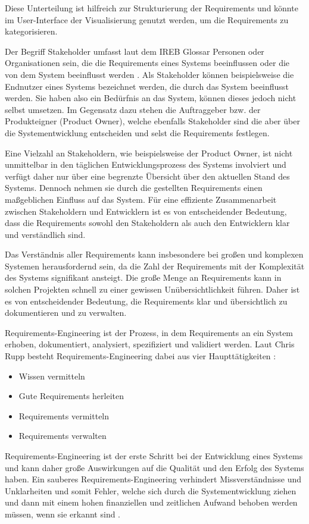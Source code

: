     Diese Unterteilung ist hilfreich zur Strukturierung der Requirements und könnte im User-Interface der Visualisierung genutzt werden, um die Requirements zu kategorisieren.
    

    Der Begriff Stakeholder umfasst laut dem IREB Glossar \glqq{}Personen oder Organisationen sein, die die Requirements eines Systems beeinflussen oder die von dem System beeinflusst werden\grqq{} \autocite[][]{ireb_cpre_glossary}.
    Als Stakeholder können beispielsweise die Endnutzer eines Systems bezeichnet werden, die durch das System beeinflusst werden.
    Sie haben also ein Bedürfnis an das System, können dieses jedoch nicht selbst umsetzen.
    Im Gegensatz dazu stehen die Auftraggeber bzw. der Produkteigner (Product Owner), welche ebenfalls Stakeholder sind die aber über die Systementwicklung entscheiden und selst die Requirements festlegen.

    Eine Vielzahl an Stakeholdern, wie beispielsweise der Product Owner, ist nicht unmittelbar in den täglichen Entwicklungsprozess des Systems involviert und verfügt daher nur über eine begrenzte Übersicht über den aktuellen Stand des Systems.
    Dennoch nehmen sie durch die gestellten Requirements einen maßgeblichen Einfluss auf das System.
    Für eine effiziente Zusammenarbeit zwischen Stakeholdern und Entwicklern ist es von entscheidender Bedeutung, dass die Requirements sowohl den Stakeholdern als auch den Entwicklern klar und verständlich sind.

    Das Verständnis aller Requirements kann insbesondere bei großen und komplexen Systemen herausfordernd sein, da die Zahl der Requirements mit der Komplexität des Systems signifikant ansteigt.
    Die große Menge an Requirements kann in solchen Projekten schnell zu einer gewissen Unübersichtlichkeit führen.
    Daher ist es von entscheidender Bedeutung, die Requirements klar und übersichtlich zu dokumentieren und zu verwalten.


    Requirements-Engineering ist der Prozess, in dem Requirements an ein System erhoben, dokumentiert, analysiert, spezifiziert und validiert werden.
    Laut Chris Rupp besteht Requirements-Engineering dabei aus vier Haupttätigkeiten \autocite[][S.20]{Rupp2014}:
    \begin{itemize}
        \item Wissen vermitteln
        \item Gute Requirements herleiten
        \item Requirements vermitteln
        \item Requirements verwalten
    \end{itemize}
    Requirements-Engineering ist der erste Schritt bei der Entwicklung eines Systems und kann daher große Auswirkungen auf die Qualität und den Erfolg des Systems haben.
    Ein sauberes Requirements-Engineering verhindert Missverständnisse und Unklarheiten und somit Fehler, welche sich durch die Systementwicklung ziehen und dann mit einem hohen finanziellen und zeitlichen Aufwand behoben werden müssen, wenn sie erkannt sind \autocite[][S.20]{Rupp2014}.

